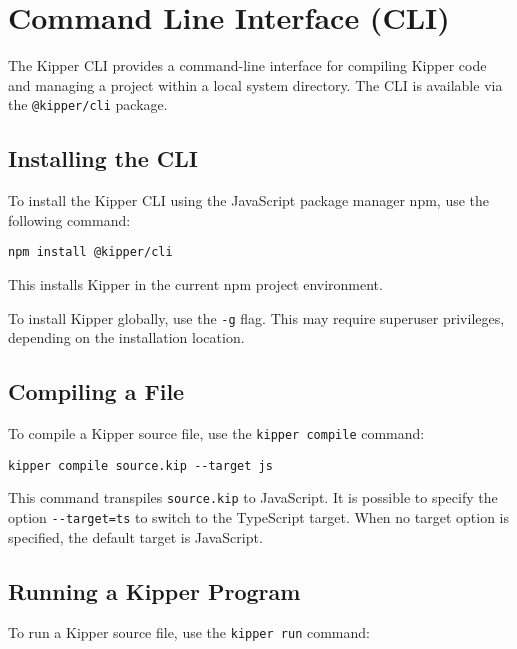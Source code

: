 \section{Command Line Interface (CLI)}
\label{sec:cli}

The Kipper CLI provides a command-line interface for compiling Kipper code and managing a project within a local system directory. The CLI is available via the \lstinline|@kipper/cli| package.

\subsection{Installing the CLI}
\label{subsec:cli-installation}

To install the Kipper CLI using the JavaScript package manager npm, use the following command:

\begin{lstlisting}[language=Shell,caption=Installing Kipper CLI, label=lst:cli_install]
npm install @kipper/cli
\end{lstlisting}

This installs Kipper in the current npm project environment. 

To install Kipper globally, use the \lstinline|-g| flag. This may require superuser privileges, depending on the installation location.

\subsection{Compiling a File}
\label{subsec:cli-compile}

To compile a Kipper source file, use the \lstinline|kipper compile| command:

\begin{lstlisting}[language=Shell,caption=Compiling a Kipper file, label=lst:cli_compile]
kipper compile source.kip --target js
\end{lstlisting}

This command \gls{transpile}s \lstinline|source.kip| to JavaScript. It is possible to specify the option \lstinline|--target=ts| to switch to the TypeScript target. When no target option is specified, the default target is JavaScript.

\subsection{Running a Kipper Program}

To run a Kipper source file, use the \lstinline|kipper run| command:

